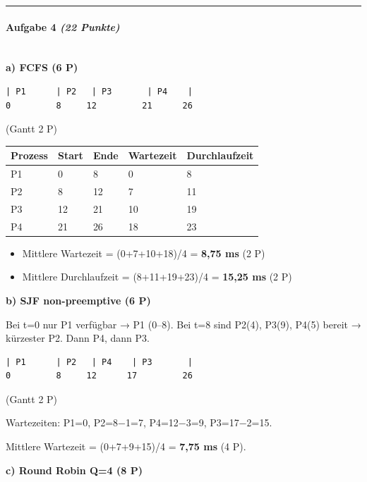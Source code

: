 \documentclass[11pt, a4paper]{article}
\begin{document}
\noindent\textcolor{rulegray}{\rule{\linewidth}{0.4pt}}


\paragraph{Aufgabe 4 \textit{(22 Punkte)}}\mbox{}\\[2pt]

\textbf{a) FCFS (6 P)}


\begin{lstlisting}
| P1      | P2   | P3       | P4    |
0         8     12         21      26
\end{lstlisting}


(Gantt 2 P)



{\small
\begin{tabularx}{\linewidth}{XXXXX}
\hline
\rowcolor{tableheadbg}
{\color{white}\textbf{Prozess}} & {\color{white}\textbf{Start}} & {\color{white}\textbf{Ende}} & {\color{white}\textbf{Wartezeit}} & {\color{white}\textbf{Durchlaufzeit}} \\[2pt]
\hline
\endhead
\hline
\endfoot
P1 & 0 & 8 & 0 & 8 \\
P2 & 8 & 12 & 7 & 11 \\
P3 & 12 & 21 & 10 & 19 \\
P4 & 21 & 26 & 18 & 23 \\
\end{tabularx}
}


\begin{itemize}
  \item Mittlere Wartezeit = (0+7+10+18)/4 = \textbf{8,75 ms} (2 P)
  \item Mittlere Durchlaufzeit = (8+11+19+23)/4 = \textbf{15,25 ms} (2 P)
\end{itemize}

\textbf{b) SJF non-preemptive (6 P)}

Bei t=0 nur P1 verfügbar → P1 (0–8). Bei t=8 sind P2(4), P3(9), P4(5) bereit → kürzester P2. Dann P4, dann P3.


\begin{lstlisting}
| P1      | P2   | P4    | P3       |
0         8     12      17         26
\end{lstlisting}

(Gantt 2 P)


Wartezeiten: P1=0, P2=8−1=7, P4=12−3=9, P3=17−2=15.

Mittlere Wartezeit = (0+7+9+15)/4 = \textbf{7,75 ms} (4 P).


\textbf{c) Round Robin Q=4 (8 P)}
\end{document}
